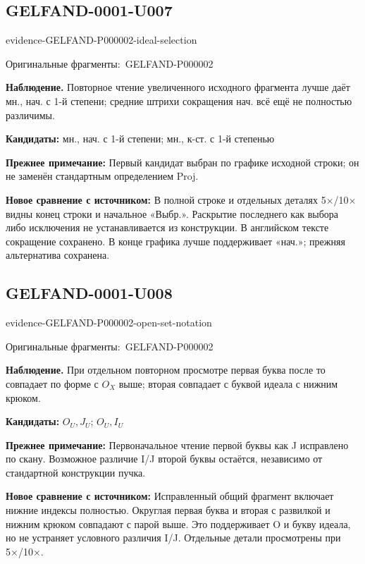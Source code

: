 \documentclass[11pt]{article}
\newcommand{\EvidenceBlock}[4]{%
 \par\smallskip\noindent\begin{minipage}{\linewidth}
 \begin{minipage}[t]{.47\linewidth}\vspace{0pt}\centering
 \csname evidence-#1-#2\endcsname\par
 {\scriptsize\SourceCropCaption\ #1}\par
 \end{minipage}\hfill
 \begin{minipage}[t]{.49\linewidth}\vspace{0pt}\raggedright
 {\small\color{orange!65!black}\textbf{#4} #3}\par
 \end{minipage}
 \end{minipage}\par\smallskip}
\newcommand{\SourceCropCaption}{Оригинальные фрагменты:}\newcommand{\ReadingCaption}{Сомнительное чтение.}\newcommand{\IncompleteCaption}{Неразобранный фрагмент.}\newcommand{\DiagramCaption}{Рисунок и набранное описание.}
\begin{document}
\subsection*{GELFAND-0001-U007}
\EvidenceBlock{GELFAND-P000002}{ideal-selection}{Повторное чтение увеличенного исходного фрагмента лучше даёт мн., нач. с 1-й степени; средние штрихи сокращения нач. всё ещё не полностью различимы.}{Наблюдение.}
\par\smallskip\noindent\textbf{Кандидаты: } мн., нач. с 1-й степени; мн., к-ст. с 1-й степенью\par
\par\smallskip\noindent\textbf{Прежнее примечание: } Первый кандидат выбран по графике исходной строки; он не заменён стандартным определением Proj.\par
\par\smallskip\noindent\textbf{Новое сравнение с источником: } В полной строке и отдельных деталях 5×/10× видны конец строки и начальное «Выбр.». Раскрытие последнего как выбора либо исключения не устанавливается из конструкции. В английском тексте сокращение сохранено. В конце графика лучше поддерживает «нач.»; прежняя альтернатива сохранена.\par

\subsection*{GELFAND-0001-U008}
\EvidenceBlock{GELFAND-P000002}{open-set-notation}{При отдельном повторном просмотре первая буква после то совпадает по форме с \(O_X\) выше; вторая совпадает с буквой идеала с нижним крюком.}{Наблюдение.}
\par\smallskip\noindent\textbf{Кандидаты: } \(O_U,J_U\); \(O_U,I_U\)\par
\par\smallskip\noindent\textbf{Прежнее примечание: } Первоначальное чтение первой буквы как J исправлено по скану. Возможное различие I/J второй буквы остаётся, независимо от стандартной конструкции пучка.\par
\par\smallskip\noindent\textbf{Новое сравнение с источником: } Исправленный общий фрагмент включает нижние индексы полностью. Округлая первая буква и вторая с развилкой и нижним крюком совпадают с парой выше. Это поддерживает O и букву идеала, но не устраняет условного различия I/J. Отдельные детали просмотрены при 5×/10×.\par
\end{document}
